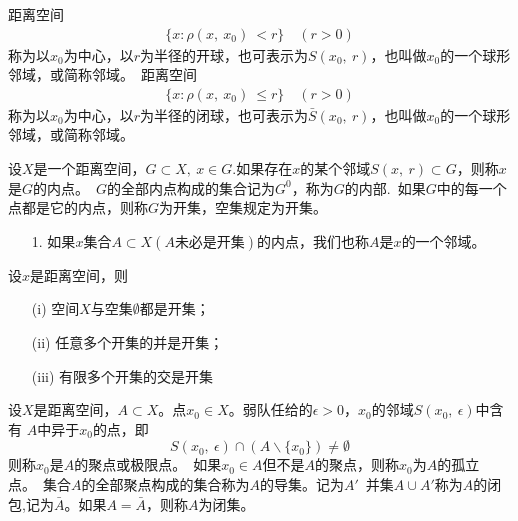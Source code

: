 \begin{newdef}
    距离空间
    \begin{align}
        \{x \colon \rho( x,\ x_0) \ <r\} \quad (r >0)
    \end{align}
    称为以$x_0$为中心，以$r$为半径的开球，也可表示为$S(x_0, \ r)$，也叫做$x_0$的一个球形邻域，或简称邻域。\
    距离空间
    \begin{align*}
        \{x \colon \rho( x,\ x_0) \ \leqslant  r\} \quad (r >0)
    \end{align*}
    称为以$x_0$为中心，以$r$为半径的闭球，也可表示为$\bar{S}(x_0, \ r)$，也叫做$x_0$的一个球形邻域，或简称邻域。
\end{newdef}

\begin{newdef}
    设$X$是一个距离空间，$G \subset X,\ x\in G.$如果存在$x$的某个邻域$S(x,\ r)\subset G$，则称$x$是$G$的内点。\ 
    $G$的全部内点构成的集合记为$G^0$，称为$G$的内部.\
    如果$G$中的每一个点都是它的内点，则称$G$为开集，空集规定为开集。
\end{newdef}
\begin{note}
    \begin{itemize}
        \item [1.] 如果$x$集合$A\subset X (A \mbox{未必是开集})$的内点，我们也称$A$是$x$的一个邻域。
    \end{itemize}
\end{note}

\begin{newthem}
    设$x$是距离空间，则\ 
    \begin{itemize}
        \item [(i)]空间$X$与空集$\emptyset$都是开集；
        \item [(ii)]任意多个开集的并是开集；
        \item [(iii)]有限多个开集的交是开集
    \end{itemize}
\end{newthem}

\begin{newdef}
    设$X$是距离空间，$A \subset X$。点$x_0 \in X$。弱队任给的$\epsilon >0 $，$x_0$的邻域$S(x_0,\ \epsilon)$中含有
    $A$中异于$x_0$的点，即$$S(x_0,\ \epsilon) \cap (A \backslash \{ x_0\}) \neq \emptyset$$
    则称$x_0$是$A$的聚点或极限点。\ 
    如果$x_0 \in A$但不是$A$的聚点，则称$x_0$为$A$的孤立点。\ 
    集合$A$的全部聚点构成的集合称为$A$的导集。记为$A'$\ 
    并集$A \cup A'$称为$A$的闭包,记为$\bar{A}$。如果$A=\bar{A} $，则称$A$为闭集。
\end{newdef}

